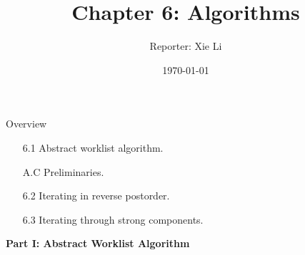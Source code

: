 \documentclass[aspectratio=1610, 13pt]{beamer}
\title{Chapter 6: Algorithms}
\author{Reporter:  Xie Li}
\date{\today}
\begin{document}
\maketitle

\begin{frame}{Overview}
\begin{itemize}
\item [6.1] Abstract  worklist algorithm.
\item [A.C] Preliminaries.
\item [6.2] Iterating in reverse postorder.
\item [6.3] Iterating through strong components.
\end{itemize}
\end{frame}

\begin{frame}
\begin{center}
\Large
\textbf{Part I: Abstract Worklist Algorithm}
\end{center}
\end{frame}
\end{document}

